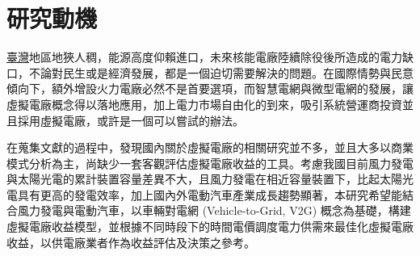 



\section{研究動機}

\uline{臺灣}地區地狹人稠，能源高度仰賴進口，未來核能電廠陸續除役後所造成的電力缺口，不論對民生或是經濟發展，都是一個迫切需要解決的問題。在國際情勢與民意傾向下，額外增設火力電廠必然不是首要選項，而智慧電網與微型電網的發展，讓虛擬電廠概念得以落地應用，加上電力市場自由化的到來，吸引系統營運商投資並且採用虛擬電廠，或許是一個可以嘗試的辦法。

在蒐集文獻的過程中，發現國內關於虛擬電廠的相關研究並不多，並且大多以商業模式分析為主，尚缺少一套客觀評估虛擬電廠收益的工具。考慮我國目前風力發電與太陽光電的累計裝置容量差異不大，且風力發電在相近容量裝置下，比起太陽光電具有更高的發電效率，加上國內外電動汽車產業成長趨勢顯著，本研究希望能結合風力發電與電動汽車，以車輛對電網 (Vehicle-to-Grid, V2G) 概念為基礎，構建虛擬電廠收益模型，並根據不同時段下的時間電價調度電力供需來最佳化虛擬電廠收益，以供電廠業者作為收益評估及決策之參考。

